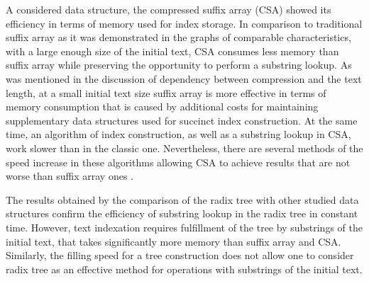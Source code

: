 
A considered data structure, the compressed suffix array (CSA) showed its efficiency
in terms of memory used for index storage. In comparison to traditional
suffix array as it was demonstrated in the graphs of comparable characteristics,
with a large enough size of the initial text, CSA consumes less memory than suffix array
while preserving the opportunity to perform a substring lookup.
As was mentioned in the discussion of dependency between compression and the text length,
at a small initial text size suffix array is more effective in terms of memory consumption that
is caused by additional costs for maintaining supplementary data structures used for succinct index construction.
At the same time, an algorithm of index construction, as well as a substring lookup in CSA,
work slower than in the classic one. Nevertheless, there are several methods of 
the speed increase in these algorithms allowing CSA to achieve results that are not worse
than suffix array ones \cite{andersensimple}.

The results obtained by the comparison of the radix tree with other studied data structures
confirm the efficiency of substring lookup in the radix tree in constant time.
However, text indexation requires fulfillment of the tree by substrings of the initial text,
that takes significantly more memory than suffix array and CSA.
Similarly, the filling speed for a tree construction does not allow one to consider
radix tree as an effective method for operations with substrings of the initial text.
